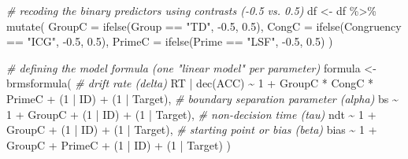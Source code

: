 \documentclass[
  11pt,
  english,
  ,doc,floatsintext]{apa6}
\newenvironment{Shaded}{}{}
\newcommand{\AttributeTok}[1]{\textcolor[rgb]{0.49,0.56,0.16}{#1}}
\newcommand{\CommentTok}[1]{\textcolor[rgb]{0.38,0.63,0.69}{\textit{#1}}}
\newcommand{\DecValTok}[1]{\textcolor[rgb]{0.25,0.63,0.44}{#1}}
\newcommand{\FloatTok}[1]{\textcolor[rgb]{0.25,0.63,0.44}{#1}}
\newcommand{\FunctionTok}[1]{\textcolor[rgb]{0.02,0.16,0.49}{#1}}
\newcommand{\NormalTok}[1]{#1}
\newcommand{\OtherTok}[1]{\textcolor[rgb]{0.00,0.44,0.13}{#1}}
\newcommand{\SpecialCharTok}[1]{\textcolor[rgb]{0.25,0.44,0.63}{#1}}
\newcommand{\StringTok}[1]{\textcolor[rgb]{0.25,0.44,0.63}{#1}}
\begin{document}
\begin{Shaded}
\begin{Highlighting}[]
\CommentTok{\# recoding the binary predictors using contrasts ({-}0.5 vs. 0.5)}
\NormalTok{df }\OtherTok{\textless{}{-}}\NormalTok{ df }\SpecialCharTok{\%\textgreater{}\%}
  \FunctionTok{mutate}\NormalTok{(}
    \AttributeTok{GroupC =} \FunctionTok{ifelse}\NormalTok{(Group }\SpecialCharTok{==} \StringTok{"TD"}\NormalTok{, }\SpecialCharTok{{-}}\FloatTok{0.5}\NormalTok{, }\FloatTok{0.5}\NormalTok{),}
    \AttributeTok{CongC =} \FunctionTok{ifelse}\NormalTok{(Congruency }\SpecialCharTok{==} \StringTok{"ICG"}\NormalTok{, }\SpecialCharTok{{-}}\FloatTok{0.5}\NormalTok{, }\FloatTok{0.5}\NormalTok{),}
    \AttributeTok{PrimeC =} \FunctionTok{ifelse}\NormalTok{(Prime }\SpecialCharTok{==} \StringTok{"LSF"}\NormalTok{, }\SpecialCharTok{{-}}\FloatTok{0.5}\NormalTok{, }\FloatTok{0.5}\NormalTok{)}
\NormalTok{    )}

\CommentTok{\# defining the model formula (one "linear model" per parameter)}
\NormalTok{formula }\OtherTok{\textless{}{-}} \FunctionTok{brmsformula}\NormalTok{(}
  \CommentTok{\# drift rate (delta)}
\NormalTok{  RT }\SpecialCharTok{|} \FunctionTok{dec}\NormalTok{(ACC) }\SpecialCharTok{\textasciitilde{}} \DecValTok{1} \SpecialCharTok{+}\NormalTok{ GroupC }\SpecialCharTok{*}\NormalTok{ CongC }\SpecialCharTok{*}\NormalTok{ PrimeC }\SpecialCharTok{+}\NormalTok{ (}\DecValTok{1} \SpecialCharTok{|}\NormalTok{ ID) }\SpecialCharTok{+}\NormalTok{ (}\DecValTok{1} \SpecialCharTok{|}\NormalTok{ Target),}
  \CommentTok{\# boundary separation parameter (alpha)}
\NormalTok{  bs }\SpecialCharTok{\textasciitilde{}} \DecValTok{1} \SpecialCharTok{+}\NormalTok{ GroupC }\SpecialCharTok{+}\NormalTok{ (}\DecValTok{1} \SpecialCharTok{|}\NormalTok{ ID) }\SpecialCharTok{+}\NormalTok{ (}\DecValTok{1} \SpecialCharTok{|}\NormalTok{ Target),}
  \CommentTok{\# non{-}decision time (tau)}
\NormalTok{  ndt }\SpecialCharTok{\textasciitilde{}} \DecValTok{1} \SpecialCharTok{+}\NormalTok{ GroupC }\SpecialCharTok{+}\NormalTok{ (}\DecValTok{1} \SpecialCharTok{|}\NormalTok{ ID) }\SpecialCharTok{+}\NormalTok{ (}\DecValTok{1} \SpecialCharTok{|}\NormalTok{ Target),}
  \CommentTok{\# starting point or bias (beta)}
\NormalTok{  bias }\SpecialCharTok{\textasciitilde{}} \DecValTok{1} \SpecialCharTok{+}\NormalTok{ GroupC }\SpecialCharTok{+}\NormalTok{ PrimeC }\SpecialCharTok{+}\NormalTok{ (}\DecValTok{1} \SpecialCharTok{|}\NormalTok{ ID) }\SpecialCharTok{+}\NormalTok{ (}\DecValTok{1} \SpecialCharTok{|}\NormalTok{ Target)}
\NormalTok{  )}


\end{Highlighting}
\end{Shaded}
\end{document}
